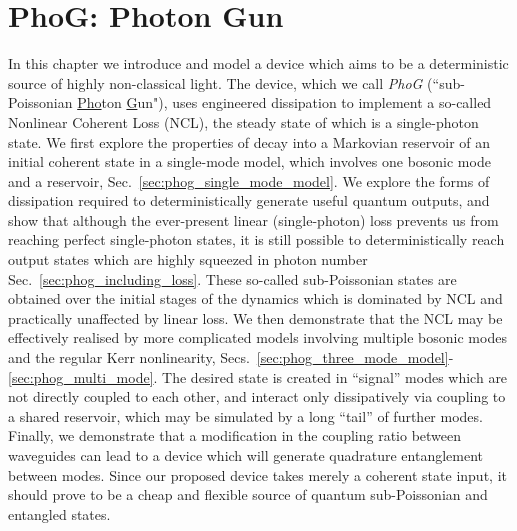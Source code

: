 %
%
%
%
%

\chapter{PhoG: Photon Gun}\label{chapter:phog}



In this chapter we introduce and model a device which aims to be a deterministic source of highly non-classical light. The device, which we call \emph{PhoG} (``sub-Poissonian \underline{Pho}ton \underline{G}un"), uses engineered dissipation to implement a so-called Nonlinear Coherent Loss (NCL), the steady state of which is a single-photon state. We first explore the properties of decay into a Markovian reservoir of an initial coherent state in a single-mode model, which involves one bosonic mode and a reservoir, Sec.~\ref{sec:phog_single_mode_model}. We explore the forms of dissipation required to deterministically generate useful quantum outputs, and show that although the ever-present linear (single-photon) loss prevents us from reaching perfect single-photon states, it is still possible to deterministically reach output states which are highly squeezed in photon number Sec.~\ref{sec:phog_including_loss}. These so-called sub-Poissonian states are obtained over the initial stages of the dynamics which is dominated by NCL and practically unaffected by linear loss. We then demonstrate that the NCL may be effectively realised by more complicated models involving multiple bosonic modes and the regular Kerr nonlinearity, Secs.~\ref{sec:phog_three_mode_model}-\ref{sec:phog_multi_mode}. The desired state is created in ``signal'' modes which are not directly coupled to each other, and interact only dissipatively via coupling to a shared reservoir, which may be simulated by a long ``tail'' of further modes. Finally, we demonstrate that a modification in the coupling ratio between waveguides can lead to a device which will generate quadrature entanglement between modes. Since our proposed device takes merely a coherent state input, it should prove to be a cheap and flexible source of quantum sub-Poissonian and entangled states.

